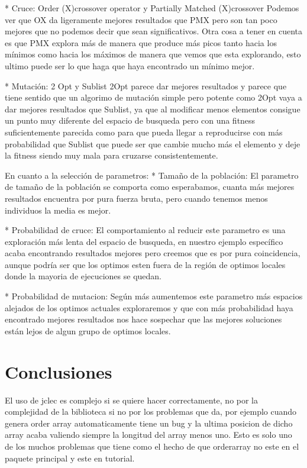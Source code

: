 \documentclass[a4paper,12pt,titlepage]{article}
\begin{document}
 * Cruce: Order (X)crossover operator  y Partially Matched (X)crossover
         Podemos ver que OX da ligeramente mejores resultados que PMX pero son tan poco mejores que no podemos decir que sean significativos. Otra cosa a tener en cuenta es que PMX explora más de manera que produce más picos tanto hacia los mínimos como hacia los máximos de manera que vemos que esta explorando, esto ultimo puede ser lo que haga que haya encontrado un mínimo mejor.

 * Mutación: 2 Opt y Sublist
         2Opt parece dar mejores resultados y parece que tiene sentido que un algorimo de mutación simple pero potente como 2Opt vaya a dar mejores resultados que Sublist, ya que al modificar menos elementos consigue un punto muy diferente del espacio de busqueda pero con una fitness suficientemente parecida como para que pueda llegar a reproducirse con más probabilidad que Sublist que puede ser que cambie mucho más el elemento y deje la fitness siendo muy mala para cruzarse consistentemente.
	 
En cuanto a la selección de parametros:
 * Tamaño de la población:
         El parametro de tamaño de la población se comporta como esperabamos, cuanta más mejores resultados encuentra por pura fuerza bruta, pero cuando tenemos menos individuos la media es mejor.
	 
 * Probabilidad de cruce:
	 El comportamiento al reducir este parametro es una exploración más lenta del espacio de busqueda, en nuestro ejemplo específico acaba encontrando resultados mejores pero creemos que es por pura coincidencia, aunque podría ser que los optimos esten fuera de la región de optimos locales donde la mayoria de ejecuciones se quedan.
	 
 * Probabilidad de mutacion:
	 Según más aumentemos este parametro más espacios alejados de los optimos actuales exploraremos y que con más probabilidad haya encontrado mejores resultados nos hace sospechar que las mejores soluciones están lejos de algun grupo de optimos locales.
	 
	 
\section{Conclusiones}
El uso de jclec es complejo si se quiere hacer correctamente, no por la complejidad de la biblioteca si no por los problemas que da, por ejemplo cuando genera order array automaticamente tiene un bug y la ultima posicion de dicho array acaba valiendo siempre la longitud del array menos uno. Esto es solo uno de los muchos problemas que tiene como el hecho de que orderarray no este en el paquete principal y este en tutorial. 
\end{document}
